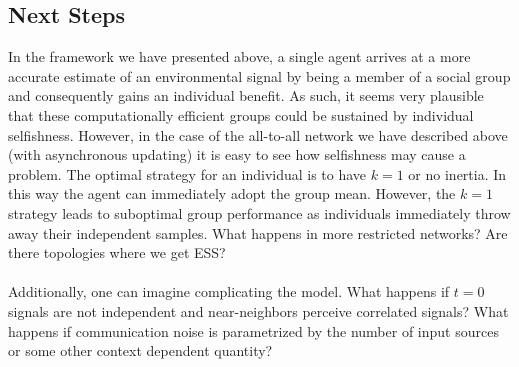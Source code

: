 \documentclass{article}
\begin{document}
\subsection*{Next Steps}
In the framework we have presented above, a single agent arrives at a more accurate estimate of an environmental signal by being a member of a social group and consequently gains an individual benefit.  As such, it seems very plausible that these computationally efficient groups could be sustained by individual selfishness.  However, in the case of the all-to-all network we have described above (with asynchronous updating) it is easy to see how selfishness may cause a problem.  The optimal strategy for an individual is to have $k=1$ or no inertia.  In this way the agent can immediately adopt the group mean.  However, the $k=1$ strategy leads to suboptimal group performance as individuals immediately throw away their independent samples.  What happens in more restricted networks?  Are there topologies where we get ESS?\\
\\
Additionally, one can imagine complicating the model.  What happens if $t=0$ signals are not independent and near-neighbors perceive correlated signals?  What happens if communication noise is parametrized by the number of input sources or some other context dependent quantity?
\end{document}
